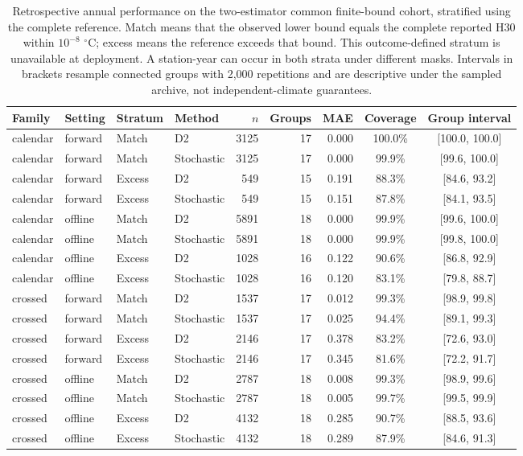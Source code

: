 \begin{table}[p]\centering\scriptsize
\caption{Retrospective annual performance on the two-estimator common finite-bound cohort, stratified using the complete reference. Match means that the observed lower bound equals the complete reported H30 within $10^{-8}$ $^{\circ}$C; excess means the reference exceeds that bound. This outcome-defined stratum is unavailable at deployment. A station-year can occur in both strata under different masks. Intervals in brackets resample connected groups with 2,000 repetitions and are descriptive under the sampled archive, not independent-climate guarantees.}\label{tab:peak-visibility}
\begin{tabular}{llllrrrcc}\toprule
Family & Setting & Stratum & Method & $n$ & Groups & MAE & Coverage & Group interval\\\midrule
calendar & forward & Match & D2 & 3125 & 17 & 0.000 & 100.0\% & [100.0, 100.0]\\
calendar & forward & Match & Stochastic & 3125 & 17 & 0.000 & 99.9\% & [99.6, 100.0]\\
calendar & forward & Excess & D2 & 549 & 15 & 0.191 & 88.3\% & [84.6, 93.2]\\
calendar & forward & Excess & Stochastic & 549 & 15 & 0.151 & 87.8\% & [84.1, 93.5]\\
calendar & offline & Match & D2 & 5891 & 18 & 0.000 & 99.9\% & [99.6, 100.0]\\
calendar & offline & Match & Stochastic & 5891 & 18 & 0.000 & 99.9\% & [99.8, 100.0]\\
calendar & offline & Excess & D2 & 1028 & 16 & 0.122 & 90.6\% & [86.8, 92.9]\\
calendar & offline & Excess & Stochastic & 1028 & 16 & 0.120 & 83.1\% & [79.8, 88.7]\\
crossed & forward & Match & D2 & 1537 & 17 & 0.012 & 99.3\% & [98.9, 99.8]\\
crossed & forward & Match & Stochastic & 1537 & 17 & 0.025 & 94.4\% & [89.1, 99.3]\\
crossed & forward & Excess & D2 & 2146 & 17 & 0.378 & 83.2\% & [72.6, 93.0]\\
crossed & forward & Excess & Stochastic & 2146 & 17 & 0.345 & 81.6\% & [72.2, 91.7]\\
crossed & offline & Match & D2 & 2787 & 18 & 0.008 & 99.3\% & [98.9, 99.6]\\
crossed & offline & Match & Stochastic & 2787 & 18 & 0.005 & 99.7\% & [99.5, 99.9]\\
crossed & offline & Excess & D2 & 4132 & 18 & 0.285 & 90.7\% & [88.5, 93.6]\\
crossed & offline & Excess & Stochastic & 4132 & 18 & 0.289 & 87.9\% & [84.6, 91.3]\\
\bottomrule\end{tabular}
\end{table}
